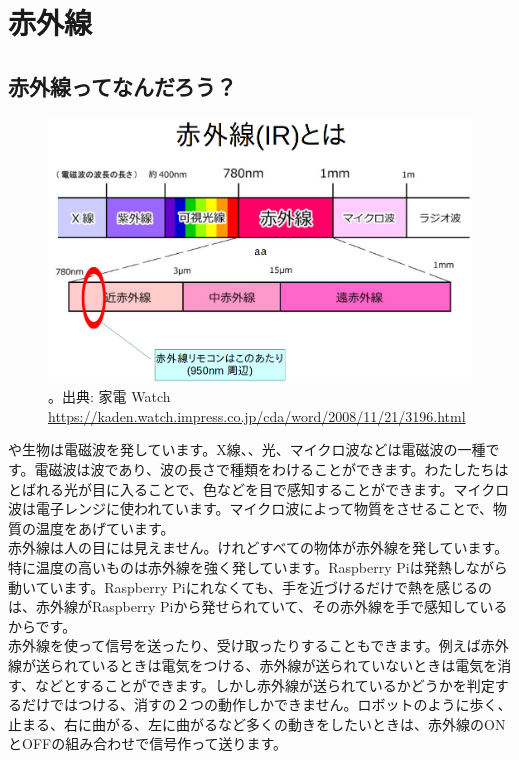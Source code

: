 \section{赤外線}
\subsection{赤外線ってなんだろう？}

\begin{figure}[H]
\centering
\includegraphics[scale=0.5]{images/chap05/text05-img036.png}
\caption{。出典: 家電 Watch \url{https://kaden.watch.impress.co.jp/cda/word/2008/11/21/3196.html} }

\end{figure}

や生物は電磁波を発しています。X線、、光、マイクロ波などは電磁波の一種です。電磁波は波であり、波の長さで種類をわけることができます。わたしたちはとばれる光が目に入ることで、色などを目で感知することができます。マイクロ波は電子レンジに使われています。マイクロ波によって物質をさせることで、物質の温度をあげています。\\

赤外線は人の目には見えません。けれどすべての物体が赤外線を発しています。特に温度の高いものは赤外線を強く発しています。Raspberry Piは発熱しながら動いています。Raspberry Piにれなくても、手を近づけるだけで熱を感じるのは、赤外線がRaspberry Piから発せられていて、その赤外線を手で感知しているからです。\\

赤外線を使って信号を送ったり、受け取ったりすることもできます。例えば赤外線が送られているときは電気をつける、赤外線が送られていないときは電気を消す、などとすることができます。しかし赤外線が送られているかどうかを判定するだけではつける、消すの２つの動作しかできません。ロボットのように歩く、止まる、右に曲がる、左に曲がるなど多くの動きをしたいときは、赤外線のONとOFFの組み合わせで信号作って送ります。

